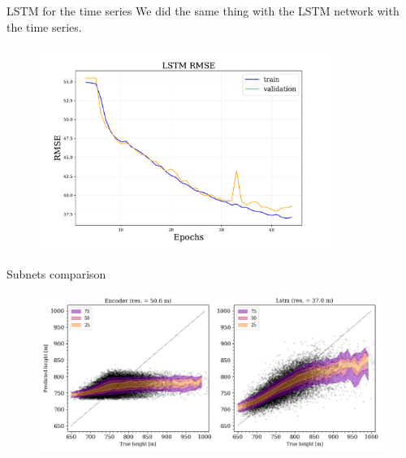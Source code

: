 \documentclass{beamer}
\begin{document}
\begin{frame}{LSTM for the time series}
    We did the same thing with the LSTM network with the time series.

    \begin{figure}
        \centering
        \includegraphics[width=0.85\textwidth]{figures/lstm_rmse.pdf}
    \end{figure}

\end{frame}

\begin{frame}{Subnets comparison}

    \begin{figure}
        \centering
        \includegraphics[width=\textwidth]{figures/comparison_subnets_diagonal.png}
    \end{figure}
    
\end{frame}
\end{document}
